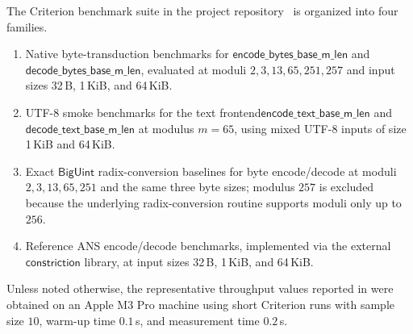 \documentclass{system-security-article}
\begin{document}
    The Criterion benchmark suite in the project repository~\cite{riabov2026encodingrepo}
    is organized into four families.
    \begin{enumerate}
        \item Native byte-transduction benchmarks for
        \(\mathsf{encode\_bytes\_base\_m\_len}\) and
        \(\mathsf{decode\_bytes\_base\_m\_len}\), evaluated at moduli
        \(2,3,13,65,251,257\) and input sizes 32\,B, 1\,KiB, and 64\,KiB\@.
        \item UTF-8 smoke benchmarks for the text frontend\(\mathsf{encode\_text\_base\_m\_len}\)
        and \(\mathsf{decode\_text\_base\_m\_len}\) at modulus \(m=65\),
        using mixed UTF-8 inputs of size 1\,KiB and 64\,KiB\@.
        \item Exact \(\mathsf{BigUint}\) radix-conversion baselines for byte encode/decode at moduli \(2,3,13,65,251\)
        and the same three byte sizes; modulus \(257\) is excluded because the underlying radix-conversion
        routine supports moduli only up to \(256\).
        \item Reference ANS encode/decode benchmarks, implemented via the external \(\mathsf{constriction}\)
        library, at input sizes 32\,B, 1\,KiB, and 64\,KiB\@.
    \end{enumerate}

    Unless noted otherwise, the representative throughput values reported in  were obtained
    on an Apple M3 Pro machine using short Criterion runs with sample size \(10\), warm-up time \(0.1\)\,s,
    and measurement time \(0.2\)\,s.

    \printbibliography[title={References}]
\end{document}
